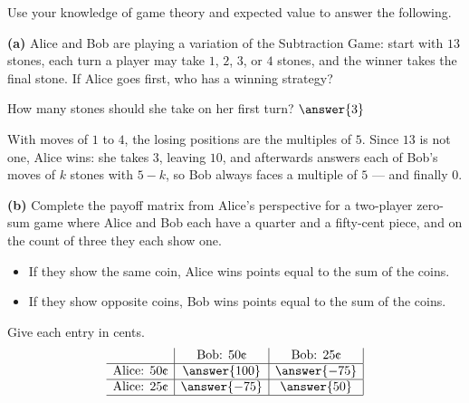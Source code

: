 \documentclass[12pt]{ximera}
\begin{document}
\begin{problem}
Use your knowledge of game theory and expected value to answer the following.

\begin{prompt}
\textbf{(a)} Alice and Bob are playing a variation of the Subtraction Game: start with
$13$ stones, each turn a player may take $1$, $2$, $3$, or $4$ stones, and the winner
takes the final stone. If Alice goes first, who has a winning strategy?

\begin{multipleChoice}
\end{multipleChoice}

How many stones should she take on her first turn? $\answer{3}$

\begin{feedback}
With moves of $1$ to $4$, the losing positions are the multiples of $5$. Since $13$ is
not one, Alice wins: she takes $3$, leaving $10$, and afterwards answers each of Bob's
moves of $k$ stones with $5-k$, so Bob always faces a multiple of $5$ --- and finally
$0$.
\end{feedback}
\end{prompt}

\begin{prompt}
\textbf{(b)} Complete the payoff matrix from Alice's perspective for a two-player
zero-sum game where Alice and Bob each have a quarter and a fifty-cent piece, and on the
count of three they each show one.
\begin{itemize}
\item If they show the same coin, Alice wins points equal to the sum of the coins.
\item If they show opposite coins, Bob wins points equal to the sum of the coins.
\end{itemize}

Give each entry in cents.
\[
\begin{array}{c|c|c|}
\phantom{|} & \text{Bob: }50\text{\textcent} & \text{Bob: }25\text{\textcent} \\\hline
\text{Alice: }50\text{\textcent} & \answer{100} & \answer{-75} \\\hline
\text{Alice: }25\text{\textcent} & \answer{-75} & \answer{50} \\\hline
\end{array}
\]


\end{prompt}
\end{problem}
\end{document}
